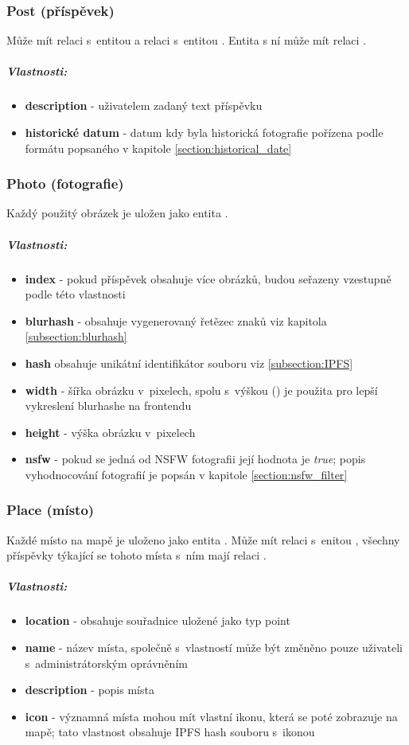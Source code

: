 \documentclass[12pt, a4paper,
  oneside,      %
]{report}
\newenvironment{propertiesItemize}{
\begin{itemize}{ 
  }}
  {\end{itemize}}
\begin{document}
\subsubsection{Post (příspěvek)}  Může mít relaci  s~entitou  a relaci  s~entitou . Entita  s ní může mít relaci .
\subparagraph{Vlastnosti:}
\begin{propertiesItemize}
	\item \textbf{description} - uživatelem zadaný text příspěvku
	\item \textbf{historické datum} - datum kdy byla historická fotografie pořízena podle formátu popsaného v kapitole \ref{section:historical_date}
\end{propertiesItemize}
\subsubsection{Photo (fotografie)} Každý použitý obrázek je uložen jako entita .
\subparagraph{Vlastnosti:}
\begin{propertiesItemize}
	\item \textbf{index} - pokud příspěvek obsahuje více obrázků, budou seřazeny vzestupně podle této vlastnosti
	\item \textbf{blurhash} - obsahuje vygenerovaný řetězec znaků viz kapitola \ref{subsection:blurhash}
	\item \textbf{hash} obsahuje unikátní identifikátor souboru viz \ref{subsection:IPFS}
	\item \textbf{width} - šířka obrázku v~pixelech, spolu s~výškou () je použita pro lepší vykreslení blurhashe na frontendu
	\item \textbf{height} - výška obrázku v~pixelech
	\item \textbf{nsfw} - pokud se jedná od NSFW fotografii její hodnota je \textit{true}; popis vyhodnocování fotografií je popsán v kapitole \ref{section:nsfw_filter}
\end{propertiesItemize}
\subsubsection{Place (místo)} Každé místo na mapě je uloženo jako entita . Může mít relaci  s~enitou , všechny příspěvky týkající se tohoto místa s~ním mají relaci .
\subparagraph{Vlastnosti:}
\begin{propertiesItemize}
	\item \textbf{location} - obsahuje souřadnice uložené jako typ point \cite{Neo4jSparialFunctions}
	\item \textbf{name} - název místa, společně s~vlastností  může být změněno pouze uživateli s~administrátorským oprávněním
	\item \textbf{description} - popis místa
	\item \textbf{icon} - významná místa mohou mít vlastní ikonu, která se poté zobrazuje na mapě; tato vlastnost obsahuje IPFS hash souboru s~ikonou
\end{propertiesItemize}
\end{document}
